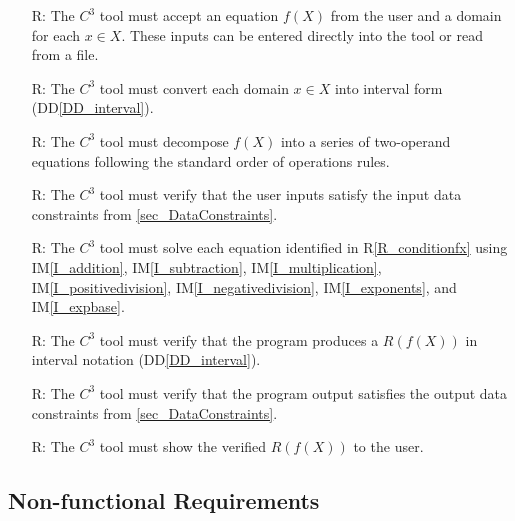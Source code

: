 \documentclass[12pt]{article}
\newcommand{\ddref}[1]{DD\ref{#1}}
\newcommand{\iref}[1]{IM\ref{#1}}
\newcounter{reqnum} %
\newcommand{\rref}[1]{R\ref{#1}}
\newcommand{\prognameAbbrv}{$C^{3}$}
\begin{document}
\noindent \begin{itemize}

\item[R\refstepcounter{reqnum}\thereqnum \label{R_Inputs}:] The 
\prognameAbbrv{} tool must accept an equation $f(X)$ from the user and a domain 
for each $x \in X$. These inputs can be entered directly into the tool or read 
from a file.

\item[R\refstepcounter{reqnum}\thereqnum \label{R_conditionX}:] The 
\prognameAbbrv{} tool must convert each domain $x \in X$ into interval form 
(\ddref{DD_interval}).

\item[R\refstepcounter{reqnum}\thereqnum \label{R_conditionfx}:] The 
\prognameAbbrv{} tool must decompose $f(X)$ into a series of two-operand 
equations following the standard order of operations rules.

\item[R\refstepcounter{reqnum}\thereqnum \label{R_verifyinputs}:] The 
\prognameAbbrv{} tool must verify that the user inputs satisfy the input data 
constraints from \ref{sec_DataConstraints}.

\item[R\refstepcounter{reqnum}\thereqnum \label{R_Calculate}:] The 
\prognameAbbrv{} tool must solve each equation identified in 
\rref{R_conditionfx} using \iref{I_addition}, \iref{I_subtraction}, 
\iref{I_multiplication}, \iref{I_positivedivision}, \iref{I_negativedivision}, 
\iref{I_exponents}, and \iref{I_expbase}.

\item[R\refstepcounter{reqnum}\thereqnum \label{R_VerifyOutput}:] The 
\prognameAbbrv{} tool must verify that the program produces a $R(f(X))$ in 
interval notation (\ddref{DD_interval}).

\item[R\refstepcounter{reqnum}\thereqnum \label{R_VerifyOutputConstraints}:] 
The 
\prognameAbbrv{} tool must verify that the program output satisfies the output 
data constraints from \ref{sec_DataConstraints}.

\item[R\refstepcounter{reqnum}\thereqnum \label{R_Output}:] The 
\prognameAbbrv{} tool must show the verified $R(f(X))$ to the user.

\end{itemize}

\subsection{Non-functional Requirements}
\end{document}
